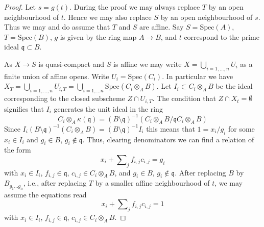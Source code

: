 \begin{proof}
Let $s = g(t)$. During the proof we may always replace $T$ by an
open neighbourhood of $t$. Hence we may also replace $S$ by an open
neighbourhood of $s$. Thus we may and do assume that $T$ and $S$ are affine.
Say $S = \text{Spec}(A)$, $T = \text{Spec}(B)$, $g$ is given by the
ring map $A \to B$, and $t$ correspond to the prime ideal
$\mathfrak q \subset B$.

\medskip\noindent
As $X \to S$ is quasi-compact and $S$ is affine we may write
$X = \bigcup_{i = 1, \ldots, n} U_i$ as a finite union of affine opens.
Write $U_i = \text{Spec}(C_i)$. In particular we have
$X_T = \bigcup_{i = 1, \ldots, n} U_{i, T} =
\bigcup_{i = 1, \ldots n} \text{Spec}(C_i \otimes_A B)$.
Let $I_i \subset C_i \otimes_A B$ be the ideal corresponding to the
closed subscheme $Z \cap U_{i, T}$. The condition that
$Z \cap X_t = \emptyset$ signifies that $I_i$ generates the
unit ideal in the ring
$$
C_i \otimes_A \kappa(\mathfrak q) =
(B \setminus \mathfrak q)^{-1}\left(
C_i \otimes_A B/\mathfrak q C_i \otimes_A B \right)
$$
Since $I_i (B \setminus \mathfrak q)^{-1}(C_i \otimes_A B) =
(B \setminus \mathfrak q)^{-1} I_i$ this means that $1 = x_i/g_i$
for some $x_i \in I_i$ and $g_i \in B$, $g_i \not \in \mathfrak q$.
Thus, clearing denominators we can find a relation of the form
$$
x_i + \sum\nolimits_j f_{i, j}c_{i, j} = g_i
$$
with $x_i \in I_i$, $f_{i, j} \in \mathfrak q$, $c_{i, j} \in C_i \otimes_A B$,
and $g_i \in B$, $g_i \not \in \mathfrak q$. After replacing $B$ by
$B_{g_1 \ldots g_n}$, i.e., after replacing $T$ by a smaller affine
neighbourhood of $t$, we may assume the equations read
$$
x_i + \sum\nolimits_j f_{i, j}c_{i, j} = 1
$$
with $x_i \in I_i$, $f_{i, j} \in \mathfrak q$, $c_{i, j} \in C_i \otimes_A B$.


\end{proof}
